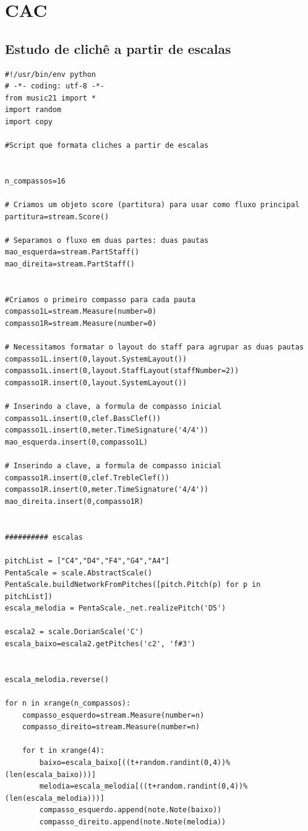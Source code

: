 \documentclass[
	12pt,				%
	openright,			%
	twoside,			%
	a4paper,			%
	english,			%
	french,				%
	spanish,			%
	brazil				%
	]{abntex2}
\begin{document}
\section{CAC}

\subsection{Estudo de clichê a partir de escalas}
\label{scriptescalas}


\begin{lstlisting}
#!/usr/bin/env python
# -*- coding: utf-8 -*-
from music21 import *
import random
import copy

#Script que formata cliches a partir de escalas


n_compassos=16

# Criamos um objeto score (partitura) para usar como fluxo principal
partitura=stream.Score()

# Separamos o fluxo em duas partes: duas pautas
mao_esquerda=stream.PartStaff()
mao_direita=stream.PartStaff()


#Criamos o primeiro compasso para cada pauta 
compasso1L=stream.Measure(number=0)
compasso1R=stream.Measure(number=0)

# Necessitamos formatar o layout do staff para agrupar as duas pautas
compasso1L.insert(0,layout.SystemLayout())
compasso1L.insert(0,layout.StaffLayout(staffNumber=2))
compasso1R.insert(0,layout.SystemLayout())

# Inserindo a clave, a formula de compasso inicial
compasso1L.insert(0,clef.BassClef())
compasso1L.insert(0,meter.TimeSignature('4/4'))
mao_esquerda.insert(0,compasso1L)

# Inserindo a clave, a formula de compasso inicial
compasso1R.insert(0,clef.TrebleClef())
compasso1R.insert(0,meter.TimeSignature('4/4'))
mao_direita.insert(0,compasso1R)


########## escalas

pitchList = ["C4","D4","F4","G4","A4"]
PentaScale = scale.AbstractScale()
PentaScale.buildNetworkFromPitches([pitch.Pitch(p) for p in pitchList])
escala_melodia = PentaScale._net.realizePitch('D5')

escala2 = scale.DorianScale('C')
escala_baixo=escala2.getPitches('c2', 'f#3')


escala_melodia.reverse()

for n in xrange(n_compassos):	
	compasso_esquerdo=stream.Measure(number=n)
	compasso_direito=stream.Measure(number=n)
		
	for t in xrange(4):
		baixo=escala_baixo[((t+random.randint(0,4))%(len(escala_baixo)))]
		melodia=escala_melodia[((t+random.randint(0,4))%(len(escala_melodia)))]
		compasso_esquerdo.append(note.Note(baixo))
		compasso_direito.append(note.Note(melodia))


\end{lstlisting}
\end{document}
